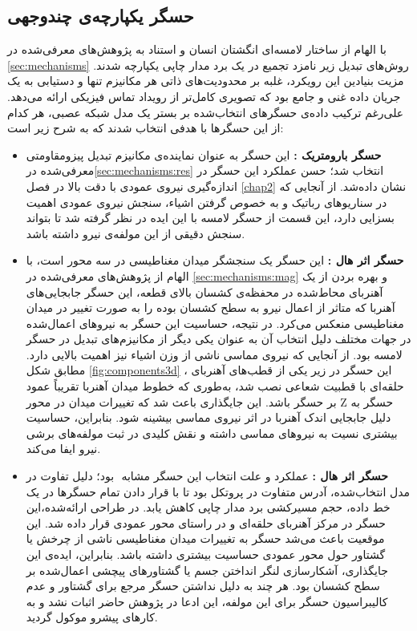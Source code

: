 \subsection{حسگر یکپارچه‌ی چندوجهی}
با الهام از ساختار لامسه‌ای انگشتان انسان و استناد به پژوهش‌های معرفی‌شده در \ref{sec:mechanisms} روش‌های تبدیل زیر نامزد تجمیع در یک برد مدار چاپی یکپارچه شدند. مزیت بنیادین این رویکرد، غلبه بر محدودیت‌های ذاتی هر مکانیزم تنها و دستیابی به یک جریان داده غنی و جامع بود که تصویری کامل‌تر از رویداد تماس فیزیکی ارائه می‌دهد. علی‌رغم ترکیب داده‌ی حسگرهای انتخاب‌شده بر بستر یک مدل شبکه عصبی، هر کدام از این حسگر‌ها با هدفی انتخاب شدند که به شرح زیر است:
\begin{itemize}
	\item 
	\textbf{حسگر بارومتریک  :}
	این حسگر به عنوان نماینده‌ی مکانیزم تبدیل پیزومقاومتی معرفی‌شده در\ref{sec:mechanisms:res} انتخاب شد؛ حسن عملکرد این حسگر در اندازه‌گیری نیروی عمودی با دقت بالا در فصل \ref{chap2} نشان داده‌شد. از آنجایی که در سناریو‌های رباتیک و به خصوص گرفتن اشیاء، سنجش نیروی عمودی اهمیت بسزایی دارد، این قسمت از حسگر لامسه با این ایده در نظر گرفته شد تا بتواند سنجش دقیقی از این مولفه‌ی نیرو داشته باشد.
	\item 
	\textbf{حسگر اثر هال :}
	این حسگر یک سنجشگر میدان مغناطیسی در سه محور است، با الهام از پژوهش‌های معرفی‌‌شده در \ref{sec:mechanisms:mag} و بهره بردن از یک آهنربای محاط‌شده در محفظه‌ی کشسان بالای قطعه، این حسگر جابجایی‌های آهنربا که متاثر از اعمال نیرو به سطح کشسان بوده را به صورت تغییر در میدان مغناطیسی منعکس می‌کرد. در نتیجه‌، حساسیت این حسگر به نیرو‌های اعمال‌شده در جهات مختلف دلیل انتخاب آن به عنوان یکی دیگر از مکانیزم‌های تبدیل در حسگر لامسه بود. از آنجایی که نیروی مماسی ناشی از وزن اشیاء نیز اهمیت بالایی دارد. مطابق شکل 
	\ref{fig:components3d}
	، این حسگر در زیر یکی از قطب‌های آهنربای حلقه‌ای با قطبیت شعاعی نصب شد، به‌طوری ‌که خطوط میدان آهنربا تقریباً عمود بر حسگر باشد. این جایگذاری باعث شد که تغییرات میدان در محور Z حسگر به دلیل جابجایی اندک آهنربا در اثر نیروی مماسی  بیشینه شود. بنابراین،  حساسیت بیشتری نسیت به نیرو‌های مماسی داشته و نقش کلیدی در ثبت مولفه‌های برشی نیرو ایفا می‌کند.
	 \item
	\textbf{حسگر اثر هال :}
	 عملکرد و علت انتخاب این حسگر مشابه ‌ بود؛ دلیل تفاوت در مدل انتخاب‌شده، آدرس متفاوت در پروتکل  بود تا با قرار دادن تمام حسگر‌ها در یک خط داده، حجم مسیر‌کشی برد مدار چاپی کاهش یابد.
در طراحی ارائه‌شده،این حسگر در مرکز آهنربای حلقه‌ای و در راستای محور عمودی قرار داده شد. این موقعیت باعث می‌شد حسگر به تغییرات میدان مغناطیسی ناشی از چرخش یا گشتاور حول محور عمودی حساسیت بیشتری داشته باشد. بنابراین، ایده‌ی این جایگذاری، آشکارسازی لنگر انداختن جسم یا گشتاورهای پیچشی اعمال‌شده بر سطح کشسان بود. هر چند به دلیل نداشتن حسگر مرجع برای گشتاور و عدم کالیبراسیون حسگر برای این مولفه، این ادعا در پژوهش حاضر اثبات نشد و به کارهای پیشرو موکول گردید.

\end{itemize}
